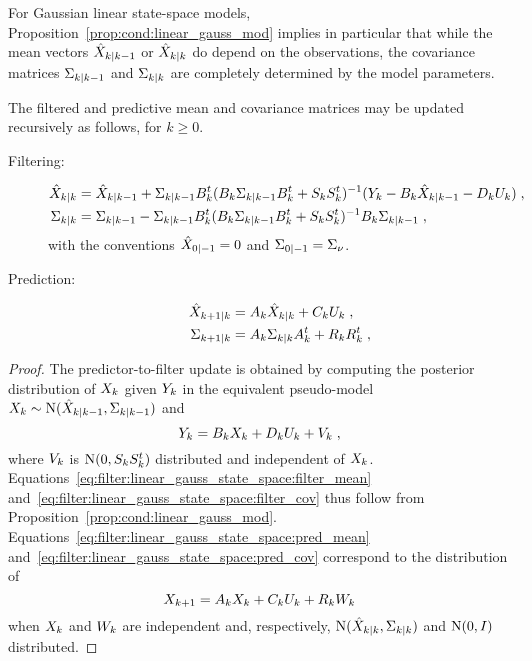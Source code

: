 For Gaussian linear state-space models,
Proposition~\ref{prop:cond:linear_gauss_mod} implies in particular that while
the mean vectors $\hat{X}_{k|k-1}$ or $\hat{X}_{k|k}$ do depend on the
observations, the covariance matrices $\Sigma_{k|k-1}$ and $\Sigma_{k|k}$ are
completely determined by the model parameters. 
\begin{prop}
  \label{prop:filter:linear_gauss_state_space}
  The filtered and predictive mean and covariance matrices may be updated recursively as follows, for $k\geq 0$.
  \begin{description}
  \item[Filtering:]
  \begin{align}
    \filtmean{k} & = \postmean{k}{k-1} + \postcov{k}{k-1} \B_k^t (\B_k\postcov{k}{k-1}\B_k^t + \VCov[k])^{-1}(\Y_k-\B_k \postmean{k}{k-1} - \D_k \U_k) \eqsp , \label{eq:filter:linear_gauss_state_space:filter_mean}\\
    \filtcov{k} & = \postcov{k}{k-1} - \postcov{k}{k-1} \B_k^t (\B_k\postcov{k}{k-1}\B_k^t + \VCov[k])^{-1}\B_k \postcov{k}{k-1} \eqsp , \label{eq:filter:linear_gauss_state_space:filter_cov}
  \end{align}
  with the conventions $\hat{X}_{0|-1} = 0$ and
  $\Sigma_{0|-1} = \Sigma_{\nu}$.

  \smallskip
  \item[Prediction:]
  \begin{align}
    \postmean{k+1}{k} & = \A_{k} \filtmean{k} + \C_k \U_k \eqsp , \label{eq:filter:linear_gauss_state_space:pred_mean}\\
    \postcov{k+1}{k} & = \A_{k} \filtcov{k} \A_{k}^t + \WCov[k] \eqsp , \label{eq:filter:linear_gauss_state_space:pred_cov}
  \end{align}
  \end{description}
\end{prop}

\begin{proof}
  The predictor-to-filter update is obtained by computing the posterior
  distribution of $X_k$ given $Y_k$ in the equivalent pseudo-model $X_k
  \sim \operatorname{N}(\hat{X}_{k|k-1}, \Sigma_{k|k-1})$ and
  \[
    Y_k = B_k X_k + D_k U_k + V_k \;,
  \]
  where $V_k$ is $\gauss(0,\VCov[k])$ distributed and independent of $X_k$.
  Equations~\eqref{eq:filter:linear_gauss_state_space:filter_mean}
  and~\eqref{eq:filter:linear_gauss_state_space:filter_cov} thus follow from
  Proposition~\ref{prop:cond:linear_gauss_mod}. Equations~\eqref{eq:filter:linear_gauss_state_space:pred_mean} and~\eqref{eq:filter:linear_gauss_state_space:pred_cov} correspond to the distribution of
\[
  X_{k+1} = A_{k} X_k + C_k U_k + R_{k}W_{k}
\]
when $X_k$ and $W_k$ are independent and, respectively,
$\operatorname{N}(\hat{X}_{k|k},\Sigma_{k|k})$ and $\operatorname{N}(0,I)$ distributed.
\end{proof}

